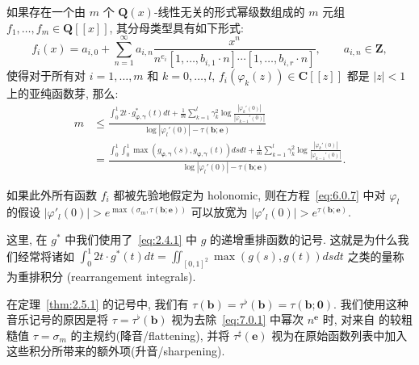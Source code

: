 \begin{theorem}
如果存在一个由 $m$ 个 $\mathbf{Q}(x)$-线性无关的形式幂级数组成的 $m$ 元组 $f_1, \dots, f_m \in \mathbf{Q}[\![x]\!]$, 其分母类型具有如下形式:
\begin{equation}\label{eq:6.0.9}
f_i(x) = a_{i,0} + \sum_{n=1}^{\infty} a_{i,n} \frac{x^n}{n^{e_i}[1, \dots, b_{i,1} \cdot n] \cdots [1, \dots, b_{i,r} \cdot n]}, \qquad a_{i,n} \in \mathbf{Z},
\end{equation}
使得对于所有对 $i = 1, \dots, m$ 和 $k = 0, \dots, l$, $f_i(\varphi_k(z)) \in \mathbf{C}[\![z]\!]$ 都是 $|z| < 1$ 上的亚纯函数芽, 那么:
\begin{align}
m &\le \frac{\int_{0}^{1} 2t \cdot g_{\boldsymbol{\varphi}, \boldsymbol{\gamma}}^{*}(t) dt + \frac{1}{m} \sum_{k=1}^{l} \gamma_{k}^{2} \log \frac{|\varphi_{k}'(0)|}{|\varphi_{k-1}'(0)|}}{\log |\varphi_{l}'(0)| - \tau(\mathbf{b}; \mathbf{e})} \nonumber\\
&= \frac{\int_{0}^{1} \int_{0}^{1} \max (g_{\boldsymbol{\varphi}, \boldsymbol{\gamma}}(s), g_{\boldsymbol{\varphi}, \boldsymbol{\gamma}}(t)) ds dt + \frac{1}{m} \sum_{k=1}^{l} \gamma_{k}^{2} \log \frac{|\varphi_{k}'(0)|}{|\varphi_{k-1}'(0)|}}{\log |\varphi_{l}'(0)| - \tau(\mathbf{b}; \mathbf{e})}.\label{eq:6.0.10}
\end{align}

如果此外所有函数 $f_i$ 都被先验地假定为 holonomic, 则在方程~\eqref{eq:6.0.7} 中对 $\varphi_l$ 的假设 $|\varphi'_l(0)| > e^{\max(\sigma_m, \tau(\mathbf{b}; \mathbf{e}))}$ 可以放宽为 $|\varphi'_l(0)| > e^{\tau(\mathbf{b}; \mathbf{e})}$.
\end{theorem}

这里, 在 $g^*$ 中我们使用了~\eqref{eq:2.4.1} 中 $g$ 的递增重排函数的记号.
这就是为什么我们经常将诸如 $\int_0^1 2t \cdot g^*(t) dt = \iint_{[0,1]^2} \max(g(s), g(t)) ds dt$ 之类的量称为重排积分 (rearrangement integrals).

\begin{remark}[音乐记号]\label{rem:6.0.11}
在定理~\ref{thm:2.5.1} 的记号中, 我们有 $\tau(\mathbf{b}) = \tau^{\flat}(\mathbf{b}) = \tau(\mathbf{b}; \mathbf{0})$.
我们使用这种音乐记号的原因是将 $\tau = \tau^{\flat}(\mathbf{b})$ 视为去除~\eqref{eq:7.0.1} 中幂次 $n^{\mathbf{e}}$ 时, 对来自 \cite{CDT24} 的较粗糙值 $\tau = \sigma_m$ 的主规约(降音/flattening), 并将 $\tau^{\sharp}(\mathbf{e})$ 视为在原始函数列表中加入这些积分所带来的额外项(升音/sharpening).
\end{remark}

